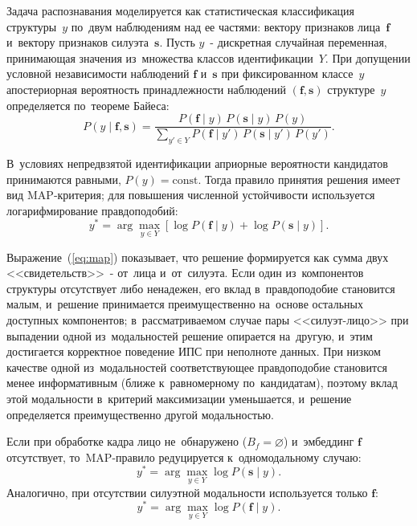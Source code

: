 Задача распознавания моделируется как статистическая классификация
структуры~$y$ по~двум наблюдениям над ее частями: вектору признаков
лица~$\mathbf{f}$ и~вектору признаков силуэта~$\mathbf{s}$. Пусть $y$~-
дискретная случайная переменная, принимающая значения из~множества
классов идентификации~$Y$. При допущении условной независимости наблюдений
$\mathbf{f}$ и~$\mathbf{s}$ при фиксированном классе~$y$ апостериорная
вероятность принадлежности наблюдений $(\mathbf{f},\mathbf{s})$ структуре~$y$
определяется по~теореме Байеса:
\begin{equation}
    P(y\mid \mathbf{f},\mathbf{s})=
    \frac{P(\mathbf{f}\mid y)\,P(\mathbf{s}\mid y)\,P(y)}
    {\sum\limits_{y'\in Y}P(\mathbf{f}\mid y')\,P(\mathbf{s}\mid y')\,P(y')}.
    \label{eq:bayes}
\end{equation}

В~условиях непредвзятой идентификации априорные вероятности кандидатов
принимаются равными, $P(y)=\mathrm{const}$. Тогда правило принятия решения
имеет вид MAP‑критерия; для повышения численной устойчивости используется
логарифмирование правдоподобий:
\begin{equation}
    y^*=\arg\max\limits_{y\in Y}
    \left[\log P(\mathbf{f}\mid y)+\log P(\mathbf{s}\mid y)\right].
    \label{eq:map}
\end{equation}

Выражение~(\ref{eq:map}) показывает, что решение формируется как сумма двух
<<свидетельств>>~- от~лица и~от~силуэта. Если один из~компонентов структуры отсутствует
либо ненадежен, его вклад в~правдоподобие становится малым, и~решение
принимается преимущественно на~основе остальных доступных компонентов;
в~рассматриваемом случае пары <<силуэт-лицо>> при выпадении одной
из~модальностей решение опирается на~другую, и~этим достигается
корректное поведение ИПС при неполноте данных. При низком качестве одной
из~модальностей соответствующее правдоподобие становится менее информативным
(ближе к~равномерному по~кандидатам), поэтому вклад этой модальности
в~критерий максимизации уменьшается, и~решение определяется преимущественно
другой модальностью.

Если при обработке кадра лицо не~обнаружено ($B_f=\varnothing$) и~эмбеддинг
$\mathbf{f}$ отсутствует, то~MAP-правило редуцируется к~одномодальному случаю:
\begin{equation}
    y^*=\arg\max\limits_{y\in Y}\log P(\mathbf{s}\mid y).
    \label{eq:map-only-s}
\end{equation}
Аналогично, при отсутствии силуэтной модальности используется только
$\mathbf{f}$:
\begin{equation}
    y^*=\arg\max\limits_{y\in Y}\log P(\mathbf{f}\mid y).
    \label{eq:map-only-f}
\end{equation}

